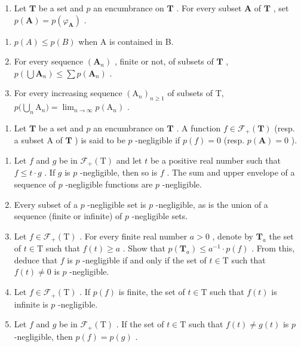 \exercisesection{}

\begin{enumerate}
\def\labelenumi{\arabic{enumi})}
\tightlist
\item
  Let \(\mathbf{T}\) be a set and \(p\) an encumbrance on \(\mathbf{T}\) . For every subset \(\mathbf{A}\) of \(\mathbf{T}\) , set \(p(\mathbf{A}) = p(\varphi_{\mathbf{A}})\) .
\end{enumerate}

\begin{enumerate}
\def\labelenumi{\alph{enumi})}
\item
  \(p(A) \leqslant p(B)\) when A is contained in B.
\item
  For every sequence \((\mathbf{A}_n)\) , finite or not, of subsets of \(\mathbf{T}\) , \(p(\bigcup \mathbf{A}_n) \leqslant \sum p(\mathbf{A}_n)\) .
\item
  For every increasing sequence \((\mathrm{A}_n)_{n\geqslant 1}\) of subsets of T, \(p\big(\bigcup_{n}\mathrm{A}_{n}\big) = \lim_{n\to \infty}p(\mathrm{A}_n)\) .
\end{enumerate}

\begin{enumerate}
\def\labelenumi{\arabic{enumi})}
\setcounter{enumi}{1}
\tightlist
\item
  Let \(\mathbf{T}\) be a set and \(p\) an encumbrance on \(\mathbf{T}\) . A function \(f \in \mathcal{F}_{+}(\mathbf{T})\) (resp. a subset A of \(\mathbf{T}\) ) is said to be \(p\) -negligible if \(p(f) = 0\) (resp. \(p(\mathbf{A}) = 0\) ).
\end{enumerate}

\begin{enumerate}
\def\labelenumi{\alph{enumi})}
\item
  Let \(f\) and \(g\) be in \(\mathcal{F}_{+}(\mathrm{T})\) and let \(t\) be a positive real number such that \(f \leqslant t \cdot g\) . If \(g\) is \(p\) -negligible, then so is \(f\) . The sum and upper envelope of a sequence of \(p\) -negligible functions are \(p\) -negligible.
\item
  Every subset of a \(p\) -negligible set is \(p\) -negligible, as is the union of a sequence (finite or infinite) of \(p\) -negligible sets.
\item
  Let \(f \in \mathcal{F}_+(\mathrm{T})\) . For every finite real number \(a > 0\) , denote by \(\mathbf{T}_a\) the set of \(t \in \mathrm{T}\) such that \(f(t) \geqslant a\) . Show that \(p(\mathbf{T}_a) \leqslant a^{-1} \cdot p(f)\) . From this, deduce that \(f\) is \(p\) -negligible if and only if the set of \(t \in \mathrm{T}\) such that \(f(t) \neq 0\) is \(p\) -negligible.
\item
  Let \(f \in \mathcal{F}_{+}(\mathrm{T})\) . If \(p(f)\) is finite, the set of \(t \in \mathrm{T}\) such that \(f(t)\) is infinite is \(p\) -negligible.
\item
  Let \(f\) and \(g\) be in \(\mathcal{F}_{+}(\mathrm{T})\) . If the set of \(t \in \mathrm{T}\) such that \(f(t) \neq g(t)\) is \(p\) -negligible, then \(p(f) = p(g)\) .
\end{enumerate}

